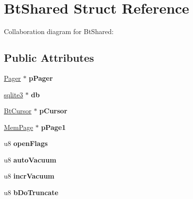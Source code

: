 \hypertarget{struct_bt_shared}{\section{Bt\+Shared Struct Reference}
\label{struct_bt_shared}
}


Collaboration diagram for Bt\+Shared\+:
\subsection*{Public Attributes}
\begin{DoxyCompactItemize}
\item 
\hypertarget{struct_bt_shared_ab79703fc47a16446274457588d7eb989}{\hyperlink{struct_pager}{Pager} $\ast$ {\bfseries p\+Pager}}\label{struct_bt_shared_ab79703fc47a16446274457588d7eb989}

\item 
\hypertarget{struct_bt_shared_a93dafa672793f6117a336d5987951c8e}{\hyperlink{structsqlite3}{sqlite3} $\ast$ {\bfseries db}}\label{struct_bt_shared_a93dafa672793f6117a336d5987951c8e}

\item 
\hypertarget{struct_bt_shared_a8f8b52dee390e5606e8e2a8511530de7}{\hyperlink{struct_bt_cursor}{Bt\+Cursor} $\ast$ {\bfseries p\+Cursor}}\label{struct_bt_shared_a8f8b52dee390e5606e8e2a8511530de7}

\item 
\hypertarget{struct_bt_shared_a296dffd1c698ec175fee109718f32d5d}{\hyperlink{struct_mem_page}{Mem\+Page} $\ast$ {\bfseries p\+Page1}}\label{struct_bt_shared_a296dffd1c698ec175fee109718f32d5d}

\item 
\hypertarget{struct_bt_shared_a8fbc250e23d7c417ccfec8cceb08329d}{u8 {\bfseries open\+Flags}}\label{struct_bt_shared_a8fbc250e23d7c417ccfec8cceb08329d}

\item 
\hypertarget{struct_bt_shared_a770c4f6244d4350f27029cb909902a61}{u8 {\bfseries auto\+Vacuum}}\label{struct_bt_shared_a770c4f6244d4350f27029cb909902a61}

\item 
\hypertarget{struct_bt_shared_a8d8ba06335a63d8a36294a0f1ae8377a}{u8 {\bfseries incr\+Vacuum}}\label{struct_bt_shared_a8d8ba06335a63d8a36294a0f1ae8377a}

\item 
\hypertarget{struct_bt_shared_a57de6e40475fc532a5de79760521e957}{u8 {\bfseries b\+Do\+Truncate}}\label{struct_bt_shared_a57de6e40475fc532a5de79760521e957}


\end{DoxyCompactItemize}
